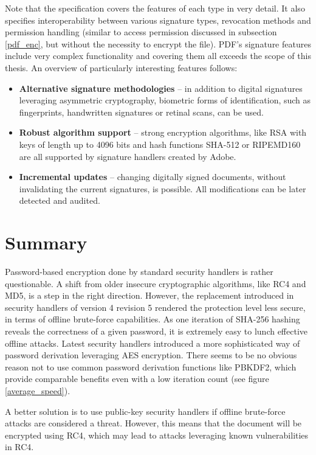 \documentclass[11pt,oneside]{fithesis2}
\begin{document}
Note that the specification covers the features of each type in very detail. It also specifies interoperability between various signature types, revocation methods and permission handling (similar to access permission discussed in subsection \ref{pdf_enc}, but without the necessity to encrypt the file). PDF's signature features include very complex functionality \cite{acrobat_dig_signatures} and covering them all exceeds the scope of this thesis. An overview of particularly interesting features follows:

\begin{itemize}
\setlength\itemsep{0.1em}
	\item{\textbf{Alternative signature methodologies} -- in addition to digital signatures leveraging asymmetric cryptography, biometric forms of identification, such as fingerprints, handwritten signatures or retinal scans, can be used.}
	\item{\textbf{Robust algorithm support} -- strong encryption algorithms, like RSA with keys of length up to 4096 bits and hash functions SHA-512 or RIPEMD160 are all supported by signature handlers created by Adobe.}
	\item{\textbf{Incremental updates} -- changing digitally signed documents, without invalidating the current signatures, is possible. All modifications can be later detected and audited.}
\end{itemize}

\section{Summary}\label{pdf_summ}

Password-based encryption done by standard security handlers is rather questionable. A shift from older insecure cryptographic algorithms, like RC4 and MD5, is a step in the right direction. However, the replacement introduced in security handlers of version 4 revision 5 rendered the protection level less secure, in terms of offline brute-force capabilities. As one iteration of SHA-256 hashing reveals the correctness of a given password, it is extremely easy to lunch effective offline attacks. Latest security handlers introduced a more sophisticated way of password derivation leveraging AES encryption. There seems to be no obvious reason not to use common password derivation functions like PBKDF2, which provide comparable benefits even with a low iteration count (see figure \ref{average_speed}). 

A better solution is to use public-key security handlers if offline brute-force attacks are considered a threat. However, this means that the document will be encrypted using RC4, which may lead to attacks leveraging known vulnerabilities in RC4. 
\end{document}
